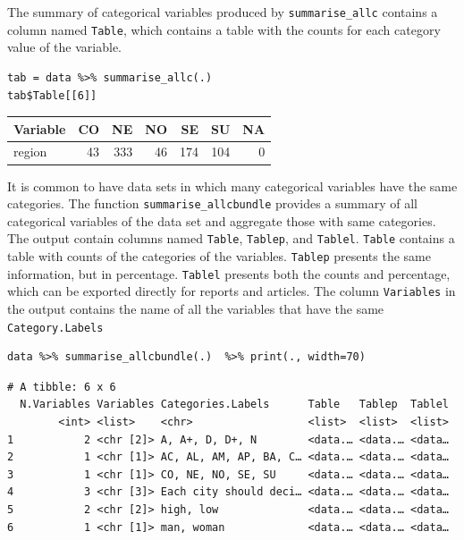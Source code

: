 \documentclass[a4paper]{article}
\begin{document}
The summary of categorical variables produced by \texttt{summarise\_allc} contains a column named \texttt{Table}, which contains a table with the counts for each category value of the variable.

\lstset{numbers=left,language=r,label=org19b65d4,caption= ,captionpos=b}
\begin{lstlisting}
tab = data %>% summarise_allc(.)
tab$Table[[6]]
\end{lstlisting}

\begin{center}
\begin{tabular}{lrrrrrr}
Variable & CO & NE & NO & SE & SU & NA\\
\hline
region & 43 & 333 & 46 & 174 & 104 & 0\\
\end{tabular}
\end{center}

It is common to have data sets in which many categorical variables have the same categories. The function \texttt{summarise\_allcbundle} provides a summary of all categorical variables of the data set and aggregate those with same categories. The output contain columns named \texttt{Table}, \texttt{Tablep}, and \texttt{Tablel}. \texttt{Table} contains a table with counts of the categories of the variables. \texttt{Tablep} presents the same information, but in percentage. \texttt{Tablel} presents both the counts and percentage, which can be exported directly for reports and articles. The column \texttt{Variables} in the output contains the name of all the variables that have the same \texttt{Category.Labels}

\lstset{numbers=left,language=r,label= ,caption= ,captionpos=b}
\begin{lstlisting}
data %>% summarise_allcbundle(.)  %>% print(., width=70)
\end{lstlisting}

\begin{verbatim}
# A tibble: 6 x 6
  N.Variables Variables Categories.Labels      Table   Tablep  Tablel
        <int> <list>    <chr>                  <list>  <list>  <list>
1           2 <chr [2]> A, A+, D, D+, N        <data.… <data.… <data…
2           1 <chr [1]> AC, AL, AM, AP, BA, C… <data.… <data.… <data…
3           1 <chr [1]> CO, NE, NO, SE, SU     <data.… <data.… <data…
4           3 <chr [3]> Each city should deci… <data.… <data.… <data…
5           2 <chr [2]> high, low              <data.… <data.… <data…
6           1 <chr [1]> man, woman             <data.… <data.… <data…
\end{verbatim}
\end{document}
